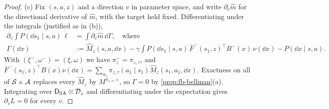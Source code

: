 \begin{proof}
(c) Fix $(s,a,z)$ and a direction $v$ in parameter space, and write $\partial_v\hat m$ for the directional derivative of $\hat m$, with the target held fixed.
Differentiating under the integrals (justified as in (b)),
\begin{align*}
\partial_v\int P(\dd s_1\mid s,a)\,\ell&=\int\partial_v\hat m\,\dd\Gamma,\quad\text{where}\\
\Gamma(\dd x)&:=\hat M_z(s,a,\dd x)-\gamma\int P(\dd s_1\mid s,a)\,\bar F^-(s_1,z)^\top B^-(x)\,\nu(\dd x)-P(\dd x\mid s,a).
\end{align*}
With $(\xi^-,\omega^-)=(\xi,\omega)$ we have $\pi^-_z=\pi_{z,\tau}$, and $\bar F^-(s_1,z)^\top B(x)\nu(\dd x)=\sum_{a_1}\pi_{z,\tau}(a_1\mid s_1)\hat M_z(s_1,a_1,\dd x)$.
Exactness on all of $\mathcal{S}\times\mathcal{A}$ replaces every $\hat M_z$ by $M^{\pi_{z,\tau},+}$, so $\Gamma=0$ by \cref{prop:fb-bellman}(a).
Integrating over $\mathsf D_{\mathrm{SA}}\otimes\mathcal D_z$ and differentiating under the expectation gives $\partial_vL=0$ for every $v$.
\end{proof}

